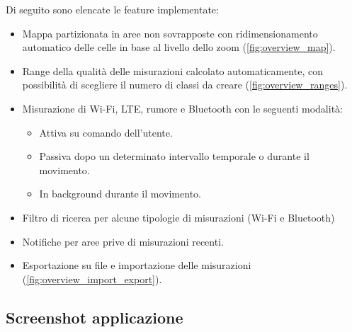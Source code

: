 \documentclass[11pt]{article}
\begin{document}
Di seguito sono elencate le feature implementate:
\begin{itemize}
    \item Mappa partizionata in aree non sovrapposte con ridimensionamento automatico delle celle in base al livello dello zoom (\cref{fig:overview_map}).
    \item Range della qualità delle misurazioni calcolato automaticamente, con possibilità di scegliere il numero di classi da creare (\cref{fig:overview_ranges}).
    \item Misurazione di Wi-Fi, LTE, rumore e Bluetooth con le seguenti modalità:
    \begin{itemize}[topsep=0pt]
        \item Attiva su comando dell'utente.
        \item Passiva dopo un determinato intervallo temporale o durante il movimento. 
        \item In background durante il movimento.
    \end{itemize}
    \item Filtro di ricerca per alcune tipologie di misurazioni (Wi-Fi e Bluetooth)
    \item Notifiche per aree prive di misurazioni recenti.
    \item Esportazione su file e importazione delle misurazioni (\cref{fig:overview_import_export}).
\end{itemize}


\subsection{Screenshot applicazione}
\end{document}
